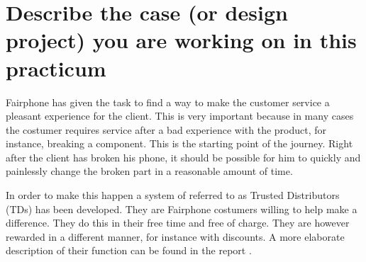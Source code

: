 \section{Describe the case (or design project) you are working on in this practicum}
Fairphone has given the task to find a way to make the customer service a pleasant experience for the client.
This is very important because in many cases the costumer requires service after a bad experience with the product, for instance, breaking a component.
This is the starting point of the journey.
Right after the client has broken his phone, it should be possible for him to quickly and painlessly change the broken part in a reasonable amount of time.


In order to make this happen a system of referred to as Trusted Distributors (TDs) has been developed.
They are Fairphone costumers willing to help make a difference.
They do this in their free time and free of charge.
They are however rewarded in a different manner, for instance with discounts.
A more elaborate description of their function can be found in the report \cite{ExploreLab}.
 